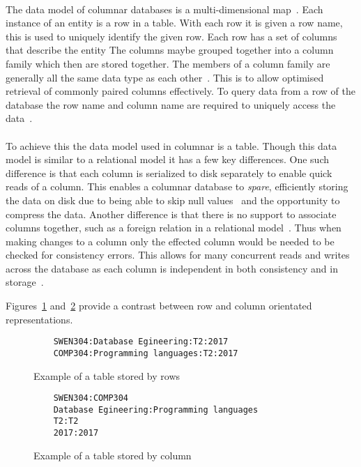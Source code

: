\documentclass{CRPITStyle}
\renewcommand{\cite}{\citep}
\begin{document}
\paragraph{}
The data model of columnar databases is a multi-dimensional
map~\cite{bigtable,nosql_eval}.
Each instance of an entity is a row in a table.
With each row it is given a row name, this is used to uniquely identify the
given row.
Each row has a set of columns that describe the entity
The columns maybe grouped together into a column family which then are
stored together.
The members of a column family are generally all the same data type as each
other~\cite{bigtable}.
This is to allow optimised retrieval of commonly paired columns effectively.
To query data from a row of the database the row name and column name are
required to uniquely access the data~\cite{bigtable}.

\paragraph{}
To achieve this the data model used in columnar is a table.
Though this data model is similar to a relational model it has a few key
differences.
One such difference is that each column is serialized to disk separately to enable
quick reads of a column.
This enables a columnar database to \textit{spare}, efficiently storing
the data on disk due to being able to skip null values~\cite{bigtable} and the
opportunity to compress the data.
Another difference is that there is no support to associate columns together,
such as a foreign relation in a relational model~\cite{relational_db,nosql_survey}.
Thus when making changes to a column only the effected column would be needed
to be checked for consistency errors.
This allows for many concurrent reads and writes across the database as each
column is independent in both consistency and in storage~\cite{nosql_survey}.


Figures~\ref{lst:row} and~\ref{lst:column} provide a contrast between
row and column orientated representations.

\begin{figure}
\begin{verbatim}
    SWEN304:Database Egineering:T2:2017
    COMP304:Programming languages:T2:2017
\end{verbatim}
\caption{Example of a table stored by rows}
\label{lst:row}
\end{figure}

\begin{figure}
\begin{verbatim}
    SWEN304:COMP304
    Database Egineering:Programming languages
    T2:T2
    2017:2017
\end{verbatim}
\caption{Example of a table stored by column}
\label{lst:column}
\end{figure}
\end{document}
